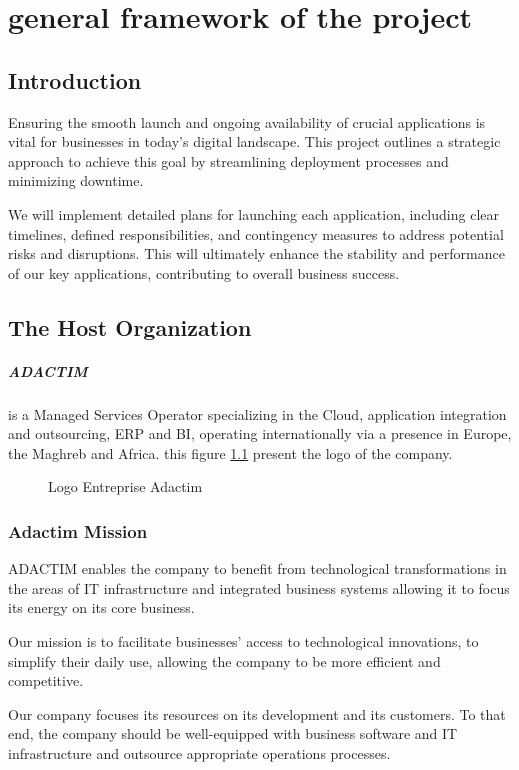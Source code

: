 \chapter{general framework of the project}
\section*{Introduction}
Ensuring the smooth launch and ongoing availability of crucial applications is vital for businesses in today's digital landscape. This project outlines a strategic approach to achieve this goal by streamlining deployment processes and minimizing downtime.
\par
We will implement detailed plans for launching each application, including clear timelines, defined responsibilities, and contingency measures to address potential risks and disruptions. This will ultimately enhance the stability and performance of our key applications, contributing to overall business success.
\section{The Host Organization}
\paragraph[short]{ADACTIM}
is a Managed Services Operator specializing in the Cloud, application integration and outsourcing, ERP and BI, operating internationally via a presence in Europe, the Maghreb and Africa.
\newline
this figure \ref{fig:logo_Adactim} present the logo of the company.

\begin{figure}[htpb]
    \centering
    \caption{Logo Entreprise Adactim}
    \label{fig:logo_Adactim}
\end{figure}

\subsection*{Adactim  Mission}
ADACTIM enables the company to benefit from technological transformations in the areas of IT infrastructure and integrated business systems allowing it to focus its energy on its core business.
\par
Our mission is to facilitate businesses' access to technological innovations, to simplify their daily use, allowing the company to be more efficient and competitive.
\par
Our company focuses its resources on its development and its customers. To that end, the company should be well-equipped with business software and IT infrastructure and outsource appropriate operations processes.

